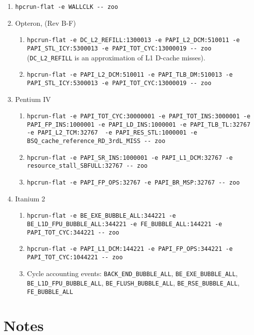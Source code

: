 \documentclass[english]{article}
\begin{document}
\begin{enumerate}
\item \verb+hpcrun-flat -e WALLCLK -- zoo+
\item Opteron, (Rev B-F)
  \begin{enumerate}
    \item \verb+hpcrun-flat -e DC_L2_REFILL:1300013 -e PAPI_L2_DCM:510011 -e PAPI_STL_ICY:5300013 -e PAPI_TOT_CYC:13000019 -- zoo+ (\verb+DC_L2_REFILL+ is an approximation of L1 D-cache misses).
    \item \verb+hpcrun-flat -e PAPI_L2_DCM:510011 -e PAPI_TLB_DM:510013 -e PAPI_STL_ICY:5300013 -e PAPI_TOT_CYC:13000019 -- zoo+
  \end{enumerate}

\item Pentium IV 
  \begin{enumerate}
    \item \verb+hpcrun-flat -e PAPI_TOT_CYC:30000001 -e PAPI_TOT_INS:3000001 -e PAPI_FP_INS:1000001 -e PAPI_LD_INS:1000001 -e PAPI_TLB_TL:32767  -e PAPI_L2_TCM:32767  -e PAPI_RES_STL:1000001 -e BSQ_cache_reference_RD_3rdL_MISS -- zoo+
    \item \verb+hpcrun-flat -e PAPI_SR_INS:1000001 -e PAPI_L1_DCM:32767 -e resource_stall_SBFULL:32767 -- zoo+
    \item \verb+hpcrun-flat -e PAPI_FP_OPS:32767 -e PAPI_BR_MSP:32767 -- zoo+
  \end{enumerate}

\item Itanium 2
  \begin{enumerate}
    \item \verb+hpcrun-flat -e BE_EXE_BUBBLE_ALL:344221 -e BE_L1D_FPU_BUBBLE_ALL:344221 -e FE_BUBBLE_ALL:144221 -e PAPI_TOT_CYC:344221 -- zoo+
    \item \verb+hpcrun-flat -e PAPI_L1_DCM:144221 -e PAPI_FP_OPS:344221 -e PAPI_TOT_CYC:1044221 -- zoo+
    \item Cycle accounting events: \verb+BACK_END_BUBBLE_ALL+, \verb+BE_EXE_BUBBLE_ALL+, \verb+BE_L1D_FPU_BUBBLE_ALL+, \verb+BE_FLUSH_BUBBLE_ALL+, \verb+BE_RSE_BUBBLE_ALL+, \verb+FE_BUBBLE_ALL+
  \end{enumerate}

\end{enumerate}

\section{Notes}
\end{document}
